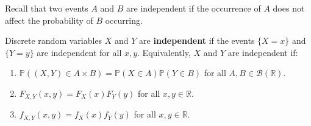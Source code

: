 \documentclass{huhtakm-template-book}
\newcommand{\prob}{\mathbb{P}}
\begin{document}
    Recall that two events $A$ and $B$ are independent if the occurrence of $A$ does not affect the probability of $B$ occurring.
    \begin{defn}
        Discrete random variables $X$ and $Y$ are \textbf{independent} if the events $\{X=x\}$ and $\{Y=y\}$ are independent for all $x,y$. Equivalently, $X$ and $Y$ are independent if:
        \begin{enumerate}
            \item $\prob((X,Y)\in A\times B)=\prob(X\in A)\prob(Y\in B)$ for all $A,B\in\mathcal{B}(\mathbb{R})$.
            \item $F_{X,Y}(x,y)=F_{X}(x)F_{Y}(y)$ for all $x,y\in\mathbb{R}$.
            \item $f_{X,Y}(x,y)=f_{X}(x)f_{Y}(y)$ for all $x,y\in\mathbb{R}$.
        \end{enumerate}
    \end{defn}
\end{document}
